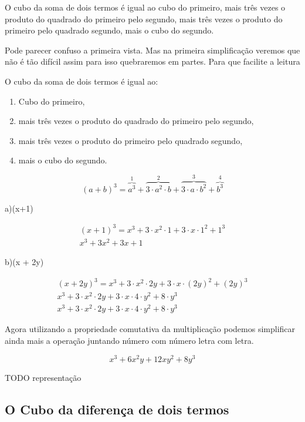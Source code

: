 \documentclass[letterpaper]{book}
\begin{document}
O cubo da soma de dois termos é igual ao cubo do primeiro, mais três vezes o produto do quadrado do primeiro pelo segundo, mais três vezes o produto do primeiro pelo quadrado segundo, mais o cubo do segundo.

Pode parecer confuso a primeira vista. Mas na primeira simplificação veremos que não é tão difícil assim para isso quebraremos em partes. Para que facilite a leitura

O cubo da soma de dois termos é igual ao:
\begin{enumerate}
\item Cubo do primeiro,
\item mais três vezes o produto do quadrado do primeiro pelo segundo, 
\item mais três vezes o produto do primeiro pelo quadrado segundo, 
\item mais o cubo do segundo.
\end{enumerate}

\[(a+b)^{3} = \overbrace{a^{3}}^{1} + \overbrace{3 \cdot a^{2} \cdot b}^{2} + \overbrace{3 \cdot a \cdot b^{2}}^{3} + \overbrace{b^{3}}^{4}\]

a)(x+1)

\begin{align}
(x+1)^{3} = x^{3} + 3 \cdot x^{2} \cdot 1 + 3 \cdot x \cdot 1^{2} + 1^{3}
\\
x^{3} + 3x^{2} + 3x + 1
\end{align}

b)(x + 2y)

\begin{align}
(x + 2y)^{3} = x^{3} + 3 \cdot x^{2} \cdot 2y + 3 \cdot x \cdot (2y)^{2} + (2y)^{3}
\\
x^{3} + 3 \cdot x^{2} \cdot 2y + 3 \cdot x \cdot 4 \cdot y^{2} + 8 \cdot y^{3}
\\
x^{3} + 3 \cdot x^{2} \cdot 2y + 3 \cdot x \cdot 4 \cdot y^{2} + 8 \cdot y^{3}
\end{align}

Agora utilizando a propriedade comutativa da multiplicação podemos simplificar ainda mais a operação juntando número com número letra com letra.

\[x^{3} + 6x^{2}y + 12xy^{2} + 8y^{3}\]


TODO representação

\subsection{O Cubo da diferença de dois termos}
\end{document}
